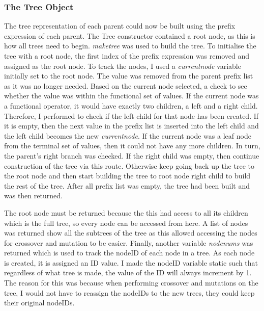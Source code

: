\documentclass[11pt]{article}
\begin{document}
\subsubsection{The Tree Object}
The tree representation of each parent could now be built using the prefix expression of each parent. The Tree constructor contained a root node, as this is how all trees need to begin. \textit{make\textunderscore tree} was used to build the tree. To initialise the tree with a root node, the first index of the prefix expression was removed and assigned as the root node. To track the nodes, I used a \textit{current\textunderscore node} variable initially set to the root node.
The value was removed from the parent prefix list as it was no longer needed. Based on the current node selected, a check to see whether the value was within the functional set of values. If the current node was a functional operator,  it would have exactly two children, a left and a right child. Therefore, I performed to check if the left child for that node has been created. If it is empty, then the next value in the prefix list is inserted into the left child and the left child becomes the new \textit{current\textunderscore node}. If the current node was a leaf node from the terminal set of values, then it could not have any more children. In turn, the parent's right branch was checked. If the right child was empty, then continue construction of the tree via this route. Otherwise keep going back up the tree to the root node and then start building the tree to root node right child to build the rest of the tree. After all prefix list was empty, the tree had been built and was then returned. 

The root node must be returned because the this had access to all its children which is the full tree, so every node can be accessed from here. A list of nodes was returned show all the subtrees of the tree as this allowed accessing the nodes for crossover and mutation to be easier. Finally, another variable \textit{nodenums} was returned which is used to track the nodeID of each node in a tree. As each node is created, it is assigned an ID value. I made the nodeID variable static such that regardless of what tree is made, the value of the ID will always increment by 1. The reason for this was because when performing crossover and mutations on the tree, I would not have to reassign the nodeIDs to the new trees, they could keep their original nodeIDs.
\end{document}
